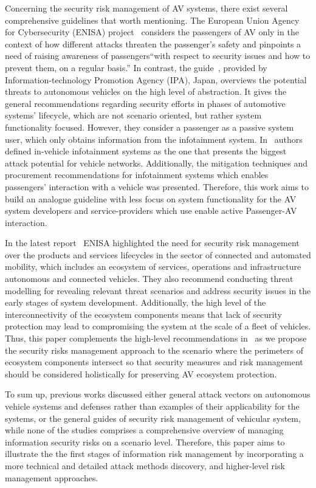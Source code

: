\documentclass[manuscript]{acmart}
\begin{document}
Concerning the security risk management of AV systems, there exist several comprehensive guidelines that worth mentioning. The European Union Agency for Cybersecurity (ENISA) project~\cite{ENISA_SmartCars} considers the passengers of AV only in the context of how different attacks threaten the passenger's safety and pinpoints a need of raising awareness of passengers``with respect to security issues and how to prevent them, on a regular basis.'' In contrast, the guide~\cite{IPA_VehicleIS}, provided by Information-technology Promotion Agency (IPA), Japan, overviews the potential threats to autonomous vehicles on the high level of abstraction. It gives the general recommendations regarding security efforts in phases of automotive systems' lifecycle, which are not scenario oriented, but rather system functionality focused. However, they consider a passenger as a passive system user, which only obtains information from the infotainment system. In~\cite{hodge2019vehicle} authors defined in-vehicle infotainment systems as the one that presents the biggest attack potential for vehicle networks. Additionally, the mitigation techniques and procurement recommendations for infotainment systems which enables passengers' interaction with a vehicle was presented. Therefore, this work aims to build an analogue guideline with less focus on system functionality for the AV system developers and service-providers which use enable active Passenger-AV interaction.

 In the latest report~\cite{ENISA_CAM2021} ENISA highlighted the need for security risk management over the products and services lifecycles in the sector of connected and automated mobility, which includes an ecosystem of services, operations and infrastructure autonomous and connected vehicles. They also recommend conducting threat modelling for revealing relevant threat scenarios and address security issues in the early stages of system development. Additionally, the high level of the interconnectivity of the ecosystem components means that lack of security protection may lead to compromising the system at the scale of a fleet of vehicles. Thus, this paper complements the high-level recommendations in~\cite{ENISA_CAM2021} as we propose the security risks management approach to the scenario where the perimeters of ecosystem components intersect so that security measures and risk management should be considered holistically for preserving AV ecosystem protection.

To sum up, previous works discussed either general attack vectors on autonomous vehicle systems and defenses rather than examples of their applicability for the systems, or the general guides of security risk management of vehicular system, while none of the studies comprises a comprehensive overview of managing information security risks on a scenario level. Therefore, this paper aims to illustrate the the first stages of information risk management by incorporating a more technical and detailed attack methods discovery, and higher-level risk management approaches.
\end{document}
